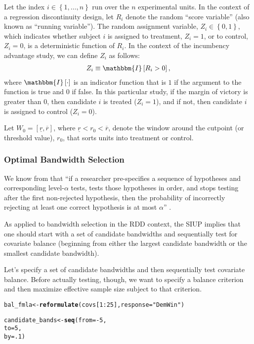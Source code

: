 \documentclass[11pt,leqno]{article}\usepackage[]{graphicx}\usepackage[]{color}
\makeatletter
\newcommand{\hlnum}[1]{\textcolor[rgb]{0.686,0.059,0.569}{#1}}%
\newcommand{\hlstr}[1]{\textcolor[rgb]{0.192,0.494,0.8}{#1}}%
\newcommand{\hlopt}[1]{\textcolor[rgb]{0,0,0}{#1}}%
\newcommand{\hlstd}[1]{\textcolor[rgb]{0.345,0.345,0.345}{#1}}%
\newcommand{\hlkwb}[1]{\textcolor[rgb]{0.69,0.353,0.396}{#1}}%
\newcommand{\hlkwc}[1]{\textcolor[rgb]{0.333,0.667,0.333}{#1}}%
\newcommand{\hlkwd}[1]{\textcolor[rgb]{0.737,0.353,0.396}{\textbf{#1}}}%
\newenvironment{kframe}{%
 \def\at@end@of@kframe{}%
 \ifinner\ifhmode%
  \def\at@end@of@kframe{\end{minipage}}%
  \begin{minipage}{\columnwidth}%
 \fi\fi%
 \def\FrameCommand##1{\hskip\@totalleftmargin \hskip-\fboxsep
 \colorbox{shadecolor}{##1}\hskip-\fboxsep
     \hskip-\linewidth \hskip-\@totalleftmargin \hskip\columnwidth}%
 \MakeFramed {\advance\hsize-\width
   \@totalleftmargin\z@ \linewidth\hsize
   \@setminipage}}%
 {\par\unskip\endMakeFramed%
 \at@end@of@kframe}
\newenvironment{knitrout}{}{} %
\theoremstyle{newstyle}
\makeatother
\begin{document}
Let the index $i \in \left\{1, \dots , n\right\}$ run over the $n$ experimental units. In the context of a regression discontinuity design, let $R_i$ denote the random ``score variable'' (also known as ``running variable''). The random assignment variable, $Z_i \in \left\{0, 1\right\}$, which indicates whether subject $i$ is assigned to treatment, $Z_i = 1$, or to control, $Z_i = 0$, is a deterministic function of $R_i$. In the context of the incumbency advantage study, we can define $Z_i$ as follows:
\begin{align*}
Z_i \equiv \mathbbm{I}\left[R_i > 0 \right],
\end{align*}
where $\mathbbm{I}\left[\cdot\right]$ is an indicator function that is $1$ if the argument to the function is true and $0$ if false. In this particular study, if the margin of victory is greater than $0$, then candidate $i$ is treated ($Z_i = 1$), and if not, then candidate $i$ is assigned to control ($Z_i = 0$).

Let $W_0 = [\underline{r}, \overline{r}]$, where $\underline{r} < r_0 < \overline{r}$, denote the window around the cutpoint (or threshold value), $r_0$, that sorts units into treatment or control.


\subsubsection{Optimal Bandwidth Selection}

We know from \citet{hansensales2015, rosenbaum2008, berger1988} that ``if a researcher pre-specifies a sequence of hypotheses and corresponding level-$\alpha$ tests, tests those hypotheses in order, and stops testing after the first non-rejected hypothesis, then the probability of incorrectly rejecting at least one correct hypothesis is at most $\alpha$'' \citep[p. 185]{hansensales2015}.

As applied to bandwidth selection in the RDD context, the SIUP implies that one should start with a set of candidate bandwidths and sequentially test for covariate balance (beginning from either the largest candidate bandwidth or the smallest candidate bandwidth).

Let's specify a set of candidate bandwidths and then sequentially test covariate balance. Before actually testing, though, we want to specify a balance criterion and then maximize effective sample size subject to that criterion.

\begin{knitrout}\footnotesize
{}\color{fgcolor}\begin{kframe}
\begin{alltt}
\hlstd{bal_fmla} \hlkwb{<-} \hlkwd{reformulate}\hlstd{(covs[}\hlnum{1}\hlopt{:}\hlnum{25}\hlstd{],} \hlkwc{response} \hlstd{=} \hlstr{"DemWin"}\hlstd{)}

\hlstd{candidate_bands} \hlkwb{<-} \hlkwd{seq}\hlstd{(}\hlkwc{from} \hlstd{=} \hlopt{-}\hlnum{5}\hlstd{,}
                       \hlkwc{to} \hlstd{=} \hlnum{5}\hlstd{,}
                       \hlkwc{by} \hlstd{=} \hlnum{.1}\hlstd{)}
\end{alltt}
\end{kframe}
\end{knitrout}
\end{document}
